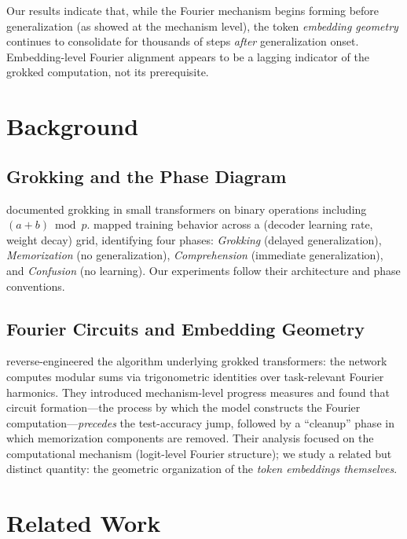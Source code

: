 \documentclass{article}
\begin{document}
Our results indicate that, while the Fourier mechanism begins
forming before generalization (as \citeauthor{nanda2023progress}
showed at the mechanism level), the token \emph{embedding geometry}
continues to consolidate for thousands of steps \emph{after}
generalization onset.
Embedding-level Fourier alignment appears to be a lagging indicator
of the grokked computation, not its prerequisite.

\section{Background}
\label{sec:background}

\subsection{Grokking and the Phase Diagram}

\citet{power2022grokking} documented grokking in small transformers on
binary operations including $(a+b)\bmod p$.
\citet{liu2022towards} mapped training behavior across a
(decoder learning rate, weight decay) grid, identifying four phases:
\textit{Grokking} (delayed generalization), \textit{Memorization} (no
generalization), \textit{Comprehension} (immediate generalization),
and \textit{Confusion} (no learning).
Our experiments follow their architecture and phase conventions.

\subsection{Fourier Circuits and Embedding Geometry}

\citet{nanda2023progress} reverse-engineered the algorithm underlying
grokked transformers: the network computes modular sums via
trigonometric identities over task-relevant Fourier harmonics.
They introduced mechanism-level progress measures and found that
circuit formation---the process by which the model constructs the
Fourier computation---\emph{precedes} the test-accuracy jump,
followed by a ``cleanup'' phase in which memorization components are
removed.
Their analysis focused on the computational mechanism (logit-level
Fourier structure); we study a related but distinct quantity: the
geometric organization of the \emph{token embeddings themselves}.

\section{Related Work}
\label{sec:related}
\end{document}
